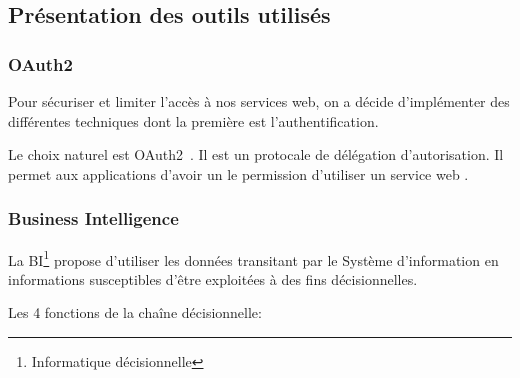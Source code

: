 \subsection{Présentation des outils utilisés}

\subsubsection{OAuth2}

Pour sécuriser et limiter l'accès à nos services web, on a décide d'implémenter des différentes techniques dont la première est l'authentification.

Le choix naturel est OAuth2~\cite{RFC6749}. Il est un protocale de délégation
d'autorisation. Il permet aux applications  d'avoir un
le permission d'utiliser un service web .



\subsubsection{Business Intelligence}

La \acrfull{BI}\footnote{Informatique décisionnelle} propose d'utiliser les
données transitant par le Système d'information en informations susceptibles
d'être exploitées à des fins décisionnelles.


Les 4 fonctions de la chaîne décisionnelle:



